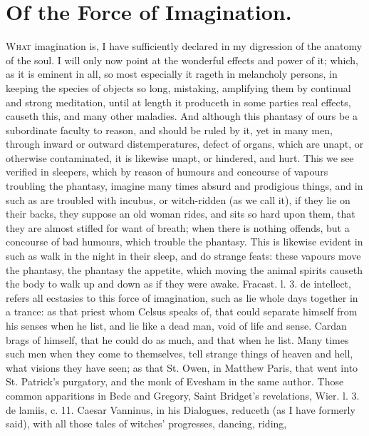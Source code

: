 {%
\section{Of the Force of Imagination.}

\lettrine{W}{hat} imagination is, I have sufficiently declared in my digression of
the anatomy of the soul. I will only now point at the wonderful effects
and power of it; which, as it is eminent in all, so most especially it
rageth in melancholy persons, in keeping the species of objects so
long, mistaking, amplifying them by continual and strong
meditation, until at length it produceth in some parties real effects,
causeth this, and many other maladies. And although this phantasy of
ours be a subordinate faculty to reason, and should be ruled by it, yet
in many men, through inward or outward distemperatures, defect of
organs, which are unapt, or otherwise contaminated, it is likewise
unapt, or hindered, and hurt. This we see verified in sleepers, which
by reason of humours and concourse of vapours troubling the phantasy,
imagine many times absurd and prodigious things, and in such as are
troubled with incubus, or witch-ridden (as we call it), if they lie on
their backs, they suppose an old woman rides, and sits so hard upon
them, that they are almost stifled for want of breath; when there is
nothing offends, but a concourse of bad humours, which trouble the
phantasy. This is likewise evident in such as walk in the night in
their sleep, and do strange feats: these vapours move the
phantasy, the phantasy the appetite, which moving the animal spirits
causeth the body to walk up and down as if they were awake. Fracast. l.
3. de intellect, refers all ecstasies to this force of imagination,
such as lie whole days together in a trance: as that priest whom
Celsus speaks of, that could separate himself from his senses
when he list, and lie like a dead man, void of life and sense. Cardan
brags of himself, that he could do as much, and that when he list. Many
times such men when they come to themselves, tell strange things of
heaven and hell, what visions they have seen; as that St. Owen, in
Matthew Paris, that went into St. Patrick's purgatory, and the monk of
Evesham in the same author. Those common apparitions in Bede and
Gregory, Saint Bridget's revelations, Wier. l. 3. de lamiis, c. 11.
Caesar Vanninus, in his Dialogues, \etc{} reduceth (as I have formerly
said), with all those tales of witches' progresses, dancing, riding,
}
